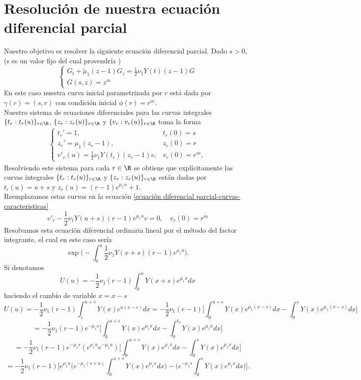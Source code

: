 \section{Resolución de nuestra ecuación diferencial parcial}
Nuestro objetivo es resolver la siguiente ecuación diferencial parcial. Dado $s>0$, (s es un valor fijo del cual provendría )
$$\begin{cases}
    G_t+\tilde{\mu}_1(z-1)G_z=\frac{1}{2}\nu_1Y(t)(z-1)G\\G(s,z)=z^m
\end{cases}$$
En este caso nuestra curva inicial parametrizada por $r$ está dada por $\gamma(r)=(s,r)$ con condición inicial $\phi(r)=r^m$.\\
Nuestro sistema de ecuaciones diferenciales para las curvas integrales $\{t_r:t_r(u)\}_{r\in\R}$, $\{z_r:z_r(u)\}_{r\in\R}$ y $\{v_r:v_r(u)\}_{r\in\R}$ toma la forma
\begin{eqnarray}
    \begin{cases}
    \label{ecuación diferencial parcial-curvas-caracteristicas}
        t_r'=1, & t_r(0)=s\\
        z_r'=\mu_1(z_r-1), & z_r(0)=r\\
        v'_r(u)=\frac{1}{2}\nu_1Y(t_r)(z_r-1)v, & v_r(0)=r^m,
    \end{cases}
\end{eqnarray}
Resolviendo este sistema para cada $r\in\R$ se obtiene que explícitamente las curvas integrales $\{t_r:t_r(u)\}_{r\in\R}$ y $\{z_r:z_r(u)\}_{r\in\R}$ están dadas por $t_r(u)=u+s$ y $z_r(u)=(r-1)e^{\mu_1 u}+1$.\\
Reemplazamos estas curvas en la ecuación \ref{ecuación diferencial parcial-curvas-caracteristicas}
$$v'_r-\frac{1}{2}\nu_1Y(u+s)(r-1)e^{\mu_1 u}v= 0, \quad v_r(0)=r^m$$
Resolvamos esta ecuación diferencial ordinaria lineal por el método del factor integrante, el cual en  este caso sería
$$\exp\bigg(-\int_0^u \frac{1}{2}\nu_1Y(x+s)(r-1)e^{\mu_1 u}\bigg).$$
Si denotamos
$$U(u)=-\frac{1}{2}\nu_1(r-1)\int_0^u Y(x+s)e^{\mu_1x} dx $$
haciendo el cambio de variable $x=x-s$
$$U(u)=-\frac{1}{2}\nu_1(r-1)\int_{s}^{u+s}Y(x)e^{u(x-s)}dx
=-\frac{1}{2}\nu_1(r-1)\bigg[\int_0^{u+s}Y(x)e^{\mu_1 (x-s)}dx-\int_0^{s}Y(x)e^{\mu_1 (x-s)}dx\bigg]$$
$$=-\frac{1}{2}\nu_1(r-1)e^{-\mu_1 s}\bigg[\int_0^{u+s}Y(x)e^{\mu_1 x}dx-\int_0^{t_0}Y(x)e^{\mu_1 x}dx\bigg]$$
$$=-\frac{1}{2}\nu_1(r-1)e^{-\mu_1 s}(e^{\mu_1 u}e^{-\mu_1 u})\bigg[\int_0^{u+s}Y(x)e^{\mu_1 x}dx-\int_0^{s}Y(x)e^{\mu_1 x}dx\bigg]$$
$$=-\frac{1}{2}\nu_1(r-1)\bigg[e^{\mu_1 u}\bigg(e^{-\mu_1 (s+u)}\int_0^{u+s}Y(x)e^{\mu_1 x}dx\bigg)-\bigg(e^{-\mu_1 s}\int_0^{s}Y(x)e^{\mu_1 x}dx\bigg)\bigg].$$
